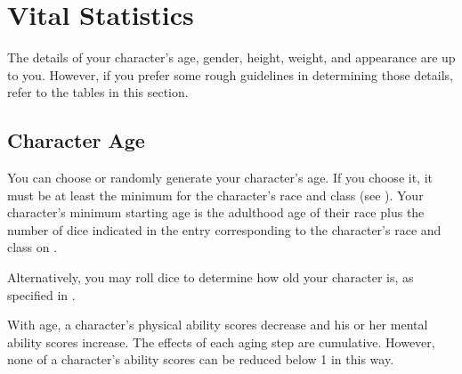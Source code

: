 \section{Vital Statistics}
The details of your character's age, gender, height, weight, and appearance are up to you. However, if you prefer some rough guidelines in determining those details, refer to the tables in this section.

\subsection{Character Age}
You can choose or randomly generate your character's age. If you choose it, it must be at least the minimum for the character's race and class (see ). Your character's minimum starting age is the adulthood age of their race plus the number of dice indicated in the entry corresponding to the character's race and class on .

Alternatively, you may roll dice to determine how old your character is, as specified in .


With age, a character's physical ability scores decrease and his or her mental ability scores increase. The effects of each aging step are cumulative. However, none of a character's ability scores can be reduced below 1 in this way.

